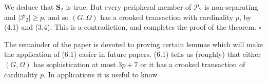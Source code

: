 We deduce that $\mathbf{S}_2$ is true. But every peripheral member of $\mathcal{P}_2$ is non-separating and $|\mathcal{P}_2| \ge p$, and so $(G, \Omega)$ has a crooked transaction with cardinality $p$, by (4.1) and (3.4). This is a contradiction, and completes the proof of the theorem. $\square$


The remainder of the paper is devoted to proving certain lemmas which will make the application of (6.1) easier in future papers. (6.1) tells us (roughly) that either $(G, \Omega)$ has sophistication at most $3p + 7$ or it has a crooked transaction of cardinality $p$. In applications it is useful to know
